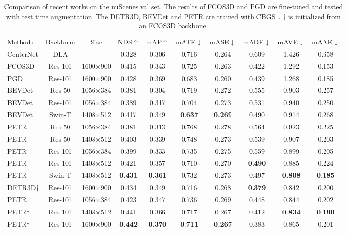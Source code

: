 \documentclass[runningheads]{llncs}
\begin{document}
\setlength{\tabcolsep}{1pt}
\begin{table}[t!]
\begin{center}
\caption{Comparison of recent works on the nuScenes val set. The results of FCOS3D and PGD are fine-tuned and tested with test time augmentation. The DETR3D, BEVDet and PETR are trained with CBGS~\cite{zhu2019class}. $\dagger$ is initialized from an FCOS3D backbone.
}
\label{table:1}
\begin{tabular}{l|cc|ccccccc}
\hline\noalign{\smallskip}
Methods & Backbone & Size  & NDS$\uparrow$ & mAP$\uparrow$ & mATE$\downarrow$ & mASE$\downarrow$ & mAOE$\downarrow$ & mAVE$\downarrow$ & mAAE$\downarrow$ \\

\noalign{\smallskip}
\hline
\noalign{\smallskip}
 CenterNet&DLA  &  - &0.328 &0.306 &0.716 &0.264 &0.609 &1.426 &0.658   \\
 FCOS3D &Res-101  & 1600$\times$900  &0.415 &0.343 &0.725 &0.263 &0.422 &1.292 &0.153   \\
 PGD &Res-101 & 1600$\times$900  &0.428 &0.369  &0.683 &0.260 &0.439 &1.268 &0.185  \\
\hline
BEVDet &Res-50 & 1056$\times$384 &0.381 &0.304 &0.719 &0.272 &0.555 &0.903 &0.257 \\
BEVDet &Res-101 & 1056$\times$384 &0.389 &0.317 &0.704 &0.273 &0.531 &0.940 &0.250 \\
BEVDet &Swin-T & 1408$\times$512  &0.417 &0.349 &\textbf{0.637} &\textbf{0.269} &0.490 &0.914 &0.268 \\
PETR &Res-50 & 1056$\times$384 &0.381 &0.313 &0.768 &0.278 &0.564 & 0.923 &0.225  \\
PETR &Res-50 & 1408$\times$512 &0.403 &0.339 &0.748 &0.273 &0.539 &0.907 &0.203  \\
PETR &Res-101 & 1056$\times$384 &0.399 &0.333 &0.735 &0.275 &0.559 & 0.899 &0.205  \\
PETR &Res-101 & 1408$\times$512 &0.421 &0.357 &0.710 &0.270 &\textbf{0.490} &0.885 &0.224 \\
PETR &Swin-T & 1408$\times$512 &\textbf{0.431} &\textbf{0.361} &0.732 &0.273 &0.497 &\textbf{0.808} &\textbf{0.185}  \\
\hline
DETR3D$\dagger$ &Res-101  & 1600$\times$900  &0.434 &0.349 &0.716 &0.268 &\textbf{0.379} &0.842 &0.200 \\
PETR$\dagger$ &Res-101 & 1056$\times$384 &0.423 &0.347 &0.736 &0.269 &0.448 & 0.844 &0.202\\PETR$\dagger$ &Res-101 & 1408$\times$512 &0.441 &0.366 &0.717 &0.267 &0.412 & \textbf{0.834} &\textbf{0.190} \\
PETR$\dagger$  &Res-101 & 1600$\times$900 &\textbf{0.442} &\textbf{0.370} &\textbf{0.711} &\textbf{0.267} &0.383 &  0.865 & 0.201 \\



\hline
\end{tabular}
\end{center}
\end{table}
\setlength{\tabcolsep}{1pt}
\end{document}

